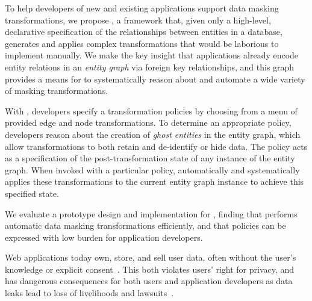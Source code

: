 To help developers of new and existing applications support data masking transformations, we propose
\sys, a framework that, given only a high-level, declarative specification of the relationships
between entities in a database, generates and applies complex transformations that would be
laborious to implement manually. We make the key insight that applications already encode entity
relations in an \emph{entity graph} via foreign key relationships, and this graph provides a means
for \sys to systematically reason about and automate a wide variety of masking transformations.

With \sys, developers specify a transformation policies by choosing from a menu of provided edge and
node transformations. To determine an appropriate policy, developers reason about the creation of
\emph{ghost entities} in the entity graph, which allow transformations to both retain and
de-identify or hide data. The policy acts as a specification of the post-transformation state of any
instance of the entity graph. When invoked with a particular policy, \sys automatically and
systematically applies these transformations to the current entity graph instance to achieve this
specified state.

We evaluate a prototype design and implementation for \sys, finding that \sys performs automatic
data masking transformations efficiently, and that policies can be expressed with low burden for
application developers.

\iffalse
%
%
Web applications today own, store, and sell user data, often without the user's knowledge or
explicit consent~\cite{nytimes:fb, npr:data}. This both violates users' right for privacy, and has
dangerous consequences for both users and application developers as data leaks lead to loss of
livelihoods and lawsuits~\cite{breach:amazon,breach:twitter, breach:fb, breach:marriott,
breach:quora}. 

